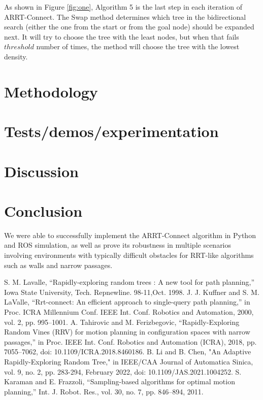 \documentclass[conference]{IEEEtran}
\begin{document}
As shown in Figure \ref{fig:one}, Algorithm 5 is the last step in each iteration of ARRT-Connect. The Swap method determines which tree in the bidirectional search (either the one from the start or from the goal node) should be expanded next. It will try to choose the tree with the least nodes, but when that fails $threshold$ number of times, the method will choose the tree with the lowest density. 


\section{Methodology}

\section{Tests/demos/experimentation}

\section{Discussion}

\section{Conclusion}

We were able to successfully implement the ARRT-Connect algorithm in Python and ROS simulation, as well as prove its robustness in multiple scenarios involving environments with typically difficult obstacles for RRT-like algorithms such as walls and narrow passages.


\clearpage
\begin{thebibliography}{00}
 S. M. Lavalle, “Rapidly-exploring random trees : A new tool for path planning,” Iowa State University, Tech. Repnewline. 98-11,Oct. 1998.
 J. J. Kuffner and S. M. LaValle, “Rrt-connect: An efficient approach to single-query path planning,” in Proc. ICRA Millennium Conf. IEEE Int. Conf. Robotics and Automation, 2000, vol. 2, pp. 995–1001. 
 A. Tahirovic and M. Ferizbegovic, “Rapidly-Exploring Random Vines (RRV) for motion planning in configuration spaces with narrow passages,” in Proc. IEEE Int. Conf. Robotics and Automation (ICRA), 2018, pp. 7055–7062, doi: 10.1109/ICRA.2018.8460186.
 B. Li and B. Chen, "An Adaptive Rapidly-Exploring Random Tree," in IEEE/CAA Journal of Automatica Sinica, vol. 9, no. 2, pp. 283-294, February 2022, doi: 10.1109/JAS.2021.1004252. 
 S. Karaman and E. Frazzoli, “Sampling-based algorithms for optimal motion planning,” Int. J. Robot. Res., vol. 30, no. 7, pp. 846–894, 2011.
\end{thebibliography}
\end{document}
